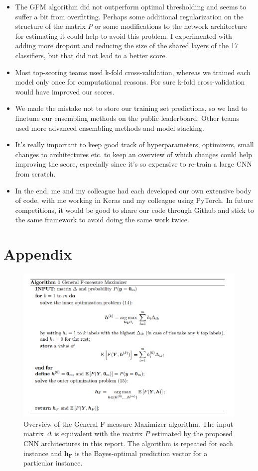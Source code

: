 \documentclass[fleqn]{homework}
\begin{document}
\begin{itemize}
\item{The GFM algorithm did not outperform optimal thresholding and seems to suffer a bit from overfitting. Perhaps some additional regularization on the structure of the matrix $P$ or some modifications to the network architecture for estimating it could help to avoid this problem. I experimented with adding more dropout and reducing the size of the shared layers of the 17 classifiers, but that did not lead to a better score.}
\item{Most top-scoring teams used k-fold cross-validation, whereas we trained each model only once for computational reasons. For sure k-fold cross-validation would have improved our scores.}
\item{We made the mistake not to store our training set predictions, so we had to finetune our ensembling methods on the public leaderboard. Other teams used more advanced ensembling methods and model stacking.}
\item{It's really important to keep good track of hyperparameters, optimizers, small changes to architectures etc. to  keep an overview of which changes could help improving the score, especially since it's so expensive to re-train a large CNN from scratch.}
\item{In the end, me and my colleague had each developed our own extensive body of code, with me working in Keras and my colleague using PyTorch. In future competitions, it would be good to share our code through Github and stick to the same framework to avoid doing the same work twice.}
\end{itemize}

\section*{Appendix}
\begin{figure}[H]
	\centering
     \includegraphics[width=1\linewidth]{figures/GFMalgo.png}
	\caption{Overview of the General F-measure Maximizer algorithm. The input matrix $\Delta$ is equivalent with the matrix $P$ estimated by the proposed CNN architectures in this report. The algorithm is repeated for each instance and $\mathbf{h_F}$ is the Bayes-optimal prediction vector for a particular instance.}
	\label{GFMalgo} 
\end{figure}
\end{document}
